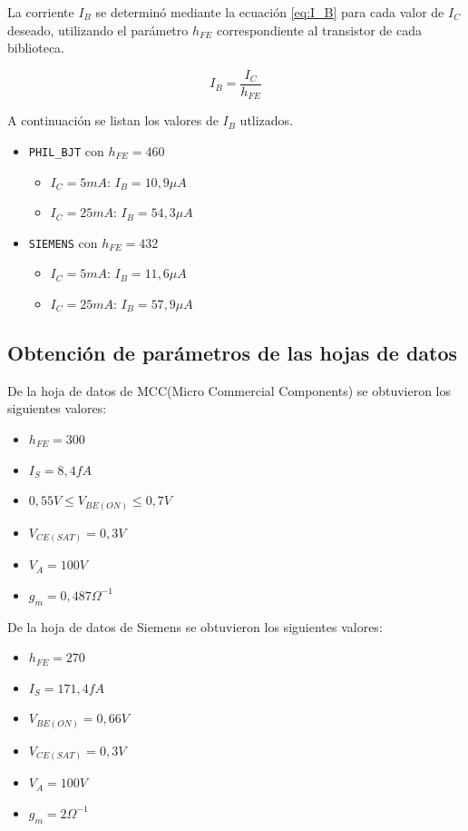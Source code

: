 \documentclass[10pt,spanish,a4paper,openany,notitlepage]{article}
\begin{document}
La corriente $I_B$ se determinó mediante la ecuación \ref{eq:I_B} para cada valor de $I_C$ deseado, utilizando el parámetro $h_{FE}$ correspondiente al transistor de cada biblioteca. 

\begin{equation}
I_B = \frac{I_C}{h_{FE}}
\label{eq:I_B}
\end{equation}

A continuación se listan los valores de $I_B$ utlizados.

\begin{itemize}
\item{\texttt{PHIL\_BJT} con $h_{FE} = 460$}
\begin{itemize}
\item{$I_C = 5 \unit{mA}$}: $I_B = 10,9\unit{\mu A}$
\item{$I_C = 25 \unit{mA}$}: $I_B = 54,3\unit{\mu A}$
\end{itemize}
\item{\texttt{SIEMENS} con $h_{FE} = 432$}
\begin{itemize}
\item{$I_C = 5 \unit{mA}$}: $I_B = 11,6\unit{\mu A}$
\item{$I_C = 25 \unit{mA}$}: $I_B = 57,9\unit{\mu A}$
\end{itemize}
\end{itemize}

\subsection{Obtención de parámetros de las hojas de datos}

De la hoja de datos de MCC(Micro Commercial Components) se obtuvieron los siguientes valores:

\begin{itemize}
\item $h_{FE} =300 $
\item $I_S = 8,4 \unit{fA}$
\item $0,55 \unit{V} \leq V_{BE(ON)} \leq 0,7 \unit{V}$
\item $V_{CE(SAT)} = 0,3 \unit{V}$
\item $V_A = 100 \unit{V}$
\item $g_m = 0,487 \Omega^{-1}$
\end{itemize}

De la hoja de datos de Siemens se obtuvieron los siguientes valores:

\begin{itemize}
\item $h_{FE} =270$
\item $I_S = 171,4 \unit{fA}$
\item $V_{BE(ON)} = 0,66\unit{V}$
\item $V_{CE(SAT)} = 0,3 \unit{V}$
\item $V_A = 100 \unit{V}$
\item $g_m = 2 \Omega^{-1}$
\end{itemize}
\end{document}
